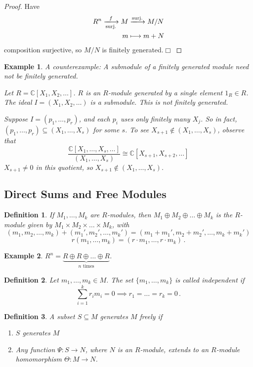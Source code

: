 \documentclass{article}
\theoremstyle{plain}\theoremheaderfont{\normalfont\itshape}\theorembodyfont{\rmfamily}\theoremseparator{.}\newtheorem*{rem}{Remark}\newtheorem*{ex}{Example}\newtheorem*{proof}{Proof}\newtheorem*{altp}{Alternative proof}\newtheorem*{nonex}{Non-Example}
\theoremstyle{plain}\theoremheaderfont{\normalfont\bfseries}\theorembodyfont{\rmfamily}\theoremseparator{.}\newtheorem{thm}{Theorem}[section]\newtheorem{lem}[thm]{Lemma}\newtheorem{prop}[thm]{Proposition}\newtheorem*{cor}{Corollary}\newtheorem{defn}[thm]{Definition}\newtheorem{clm}[thm]{Claim}\newtheorem{clminproof}{Claim}\newtheorem*{notn}{Notation}\newtheorem*{exer}{Exercise}\newtheorem*{lemnn}{Lemma}
\theoremstyle{break}\theoremheaderfont{\normalfont\itshape}\theorembodyfont{\rmfamily}\theoremseparator{.\medskip}\newtheorem*{proofskip}{Proof}\newtheorem*{exs}{Examples}\newtheorem*{rems}{Remarks}\newtheorem*{obs}{Observations}
\theoremstyle{break}\theoremheaderfont{\normalfont\bfseries}\theorembodyfont{\rmfamily}\theoremseparator{.\medskip}\newtheorem{lemskip}[thm]{Lemma}\newtheorem{defnskip}[thm]{Definition}\newtheorem{propskip}[thm]{Proposition}\newtheorem{thmskip}[thm]{Theorem}
\numberwithin{equation}{section}
\newcommand{\qed}{\hfill\ensuremath{\Box}}
\newcommand{\CC}{\mathbb{C}}
\begin{document}
    \begin{proof}
        Have
        \begin{align*}
            R^n\xlongrightarrow[\text{surj.}]{f}M&\xlongrightarrow{\text{surj.}}M/N\\
            m&\longmapsto m+N
        \end{align*}
        composition surjective, so \(M/N\) is finitely generated.\qed
    \end{proof}
    \begin{ex}
        A counterexample: A submodule of a finitely generated module need not be finitely generated.

        Let \(R=\CC[X_1,X_2,\dots]\). \(R\) is an \(R\)-module generated by a single element \(1_R\in R\). The ideal \(I=(X_1,X_2,\dots)\) is a submodule. This is not finitely generated.

        Suppose \(I=(p_1,\dots,p_r)\), and each \(p_i\) uses only finitely many \(X_j\). So in fact, \((p_1,\dots,p_r)\subseteq (X_1,\dots,X_s)\) for some \(s\). To see \(X_{s+1}\notin (X_1,\dots,X_s)\), observe that
        \[\frac{\CC[X_1,\dots,X_s,\dots]}{(X_1,\dots,X_s)}\cong\CC[X_{s+1},X_{s+2},\dots]\]
        \(X_{s+1}\ne 0\) in this quotient, so \(X_{s+1}\notin (X_1,\dots,X_s)\).
    \end{ex}
    \subsection{Direct Sums and Free Modules}
    \begin{defn}
        If \(M_1,\dots,M_k\) are \(R\)-modules, then \(M_1\oplus M_2\oplus\dots\oplus M_k\) is the \(R\)-module given by \(M_1\times M_2\times\dots\times M_k\), with
        \[(m_1,m_2,\dots,m_k)+(m_1',m_2',\dots,m_k')=(m_1+m_1',m_2+m_2',\dots,m_k+m_k')\]
        \[r(m_1,\dots,m_k)=(r\cdot m_1,\dots,r\cdot m_k)\,.\]
    \end{defn}
    \begin{ex}
        \(R^n=\underbrace{R\oplus R\oplus\dots\oplus R}_{n\text{ times}}\).
    \end{ex}
    \begin{defn}
        Let \(m_1,\dots,m_k\in M\). The set \(\{m_1,\dots,m_k\}\) is called \textit{independent} if
        \[\sum_{i=1}^{k}r_im_i=0\implies r_1=\dots=r_k=0\,.\]
    \end{defn}
    \begin{defn}
        A subset \(S\subseteq M\) \textit{generates \(M\) freely} if
        \begin{enumerate}[topsep=0pt,label=(\roman*)]
            \item \(S\) generates \(M\)
            \item Any function \(\Psi:S\to N\), where \(N\) is an \(R\)-module, extends to an \(R\)-module homomorphism \(\Theta:M\to N\).
        \end{enumerate}
    \end{defn}
\end{document}
